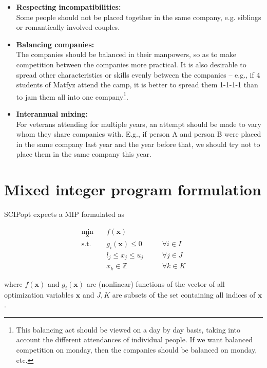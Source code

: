 \documentclass[11pt]{article}
\begin{document}
\begin{itemize}
    \item 
    \textbf{Respecting incompatibilities:}\\
    Some people should not be placed together in the same company, e.g. siblings or romantically involved couples.

    \item
    \textbf{Balancing companies:}\\
    The companies should be balanced in their manpowers, so as to make competition between the companies more practical.  It is also desirable to spread
    other characteristics or skills evenly between the companies -- e.g., if 4 students of Matfyz attend the camp, it is better to spread them 1-1-1-1 than
    to jam them all into one company\footnote{
    This balancing act should be viewed on a day by day basis, taking into account the different attendances of individual people.  If we want balanced
    competition on monday, then the companies should be balanced on monday, etc.}.

    \item
    \textbf{Interannual mixing:}\\
    For veterans attending for multiple years, an attempt should be made to vary whom they share companies with.  E.g., if person A and person B were placed 
    in the same company last year and the year before that, we should try not to place them in the same company this year.
\end{itemize}


\section{Mixed integer program formulation}

SCIPopt expects a MIP formulated as

\begin{equation}
\begin{alignedat}{2}
\underset{\mathbf{x}}{\text{min}} \quad & f(\mathbf{x})  \\ 
\text{s.t.} \quad & g_i(\mathbf{x}) \leq 0  &&\forall i \in I\\
& l_j \leq x_j \leq u_j \quad &&\forall j \in J \\
& x_k \in \mathbb{Z} &&\forall k \in K
\end{alignedat}
\tag{MIP formulation}
\label{MIP}
\end{equation}

where $f(\mathbf{x})$ and $g_i(\mathbf{x})$ are (nonlinear) functions of the vector of all optimization variables $\mathbf{x}$ and $J,K$ are subsets of 
the set containing all indices of $\mathbf{x}$.  
\end{document}
